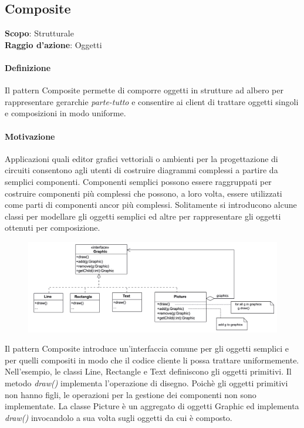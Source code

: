 \subsection{Composite}
\label{composite}

\textbf{Scopo}: Strutturale \\
\textbf{Raggio d'azione}: Oggetti

\paragraph{Definizione} Il pattern Composite permette di comporre oggetti in strutture ad albero per rappresentare gerarchie \textit{parte-tutto} e consentire ai client di trattare oggetti singoli e composizioni in modo uniforme.

\paragraph{Motivazione} Applicazioni quali editor grafici vettoriali o ambienti per la progettazione di circuiti consentono agli utenti di costruire diagrammi complessi a partire da semplici componenti. Componenti semplici possono essere raggruppati per costruire componenti più complessi che possono, a loro volta, essere utilizzati come parti di componenti ancor più complessi. Solitamente si introducono alcune classi per modellare gli oggetti semplici ed altre per rappresentare gli oggetti ottenuti per composizione.

\begin{figure}[H]
    \centering
    \includegraphics[width=0.75\linewidth]{assets/pattern/composite/composite-esempio.png}
\end{figure}

Il pattern Composite introduce un’interfaccia comune per gli oggetti semplici e per quelli compositi in modo che il codice cliente li possa trattare uniformemente. Nell’esempio, le classi Line, Rectangle e Text definiscono gli oggetti primitivi. Il metodo \textit{draw()} implementa l’operazione di disegno. Poichè gli oggetti primitivi non hanno figli, le operazioni per la gestione dei componenti non sono implementate. La classe Picture è un aggregato di oggetti Graphic ed implementa \textit{draw()} invocandolo a sua volta sugli oggetti da cui è composto.


